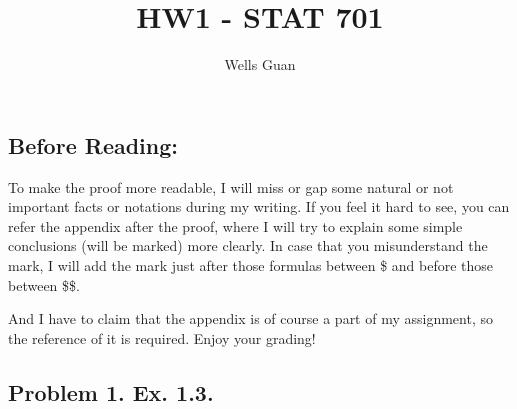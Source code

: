 \documentclass[lang=en,11pt,a4paper,citestyle =authoryear]{elegantpaper}
\title{HW1 - STAT 701}
\author{Wells Guan}
\begin{document}
\maketitle

\subsection*{Before Reading:}\par
To make the proof more readable, I will miss or gap some natural or not important facts or notations during my writing. If you feel it hard to see, you can refer the appendix after the proof, where I will try to explain some simple conclusions (will be marked) more clearly. In case that you misunderstand the mark, I will add the mark just after those formulas between \$ and before those between \$\$.\par
And I have to claim that the appendix is of course a part of my assignment, so the reference of it is required. Enjoy your grading!

\subsection*{Problem 1. Ex. 1.3.} 
\end{document}
